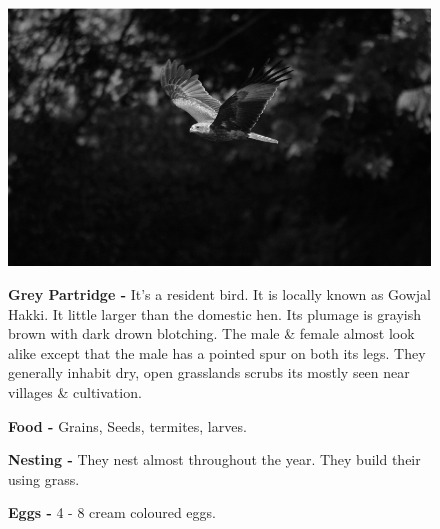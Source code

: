 \begin{figure}[H]
\begin{center}
\includegraphics{figure/Land_birds/01_pariah_kite/pariah-kite.eps}
\end{center}
\medskip
\noindent
{\bf Grey Partridge -} It's a resident bird. It is locally known as Gowjal Hakki. It little larger than the domestic hen. Its plumage is grayish brown with dark drown blotching. The male \& female almost look alike except that the male has a pointed spur on both its legs. They generally inhabit dry, open grasslands scrubs its mostly seen near villages \& cultivation.

\medskip
{\bf Food -} Grains, Seeds, termites, larves.

{\bf Nesting -} They nest almost throughout the year. They build their using grass.

{\bf Eggs -} 4 - 8 cream coloured eggs.
\end{figure}

\vfill\eject

~\phantom{a}
\vfill

